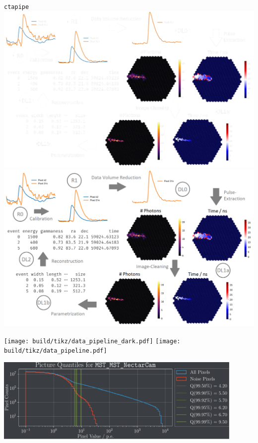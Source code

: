 \begin{frame}{\texttt{ctapipe}}
    {%
    \centering
    \includegraphics[height=0.95\textheight]{graphics/ctapipe_light.pdf}
    }
    {%
    \centering
    \includegraphics[height=0.95\textheight]{graphics/ctapipe.png}
    }
\end{frame}

\begin{frame}
    {%
    \centering
    \texttt{[image: build/tikz/data\_pipeline\_dark.pdf]}
    }
    {%
    \centering
    \texttt{[image: build/tikz/data\_pipeline.pdf]}
    }

\end{frame}

    {%
    
    }
    {%
    
    }


\begin{frame}
    \centering
    \includegraphics[width=0.9\textwidth]{build/quantiles_plot.pdf}
\end{frame}